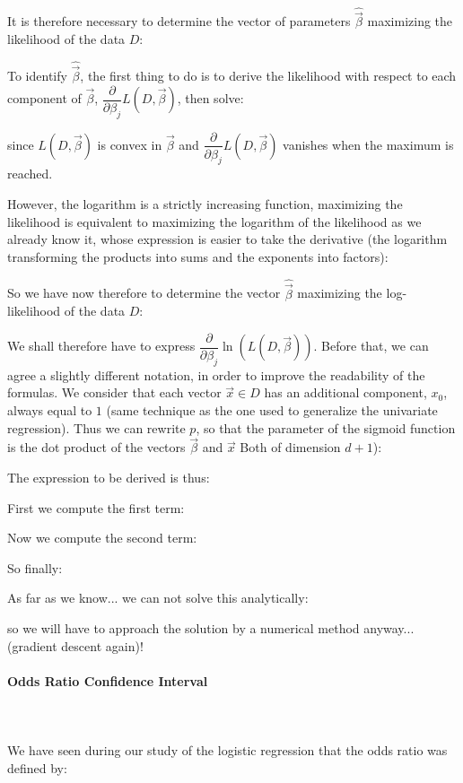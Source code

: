 	It is therefore necessary to determine the vector of parameters $\hat{\vec{\beta}}$ maximizing the likelihood of the data $D$:
	
	To identify $\hat{\vec{\beta}}$, the first thing to do is to derive the likelihood with respect to each component of $\vec{\beta}$, $\dfrac{\partial }{\partial \beta_j}L(D,\vec{\beta})$, then solve:
	
	since $L(D,\vec{\beta})$ is convex in $\vec{\beta}$ and $\dfrac{\partial }{\partial \beta_j}L(D,\vec{\beta})$ vanishes when the maximum is reached.
	
	However, the logarithm is a strictly increasing function, maximizing the likelihood is equivalent to maximizing the logarithm of the likelihood as we already know it, whose expression is easier to take the derivative (the logarithm transforming the products into sums and the exponents into factors):
	
	So we have now therefore to determine the vector $\hat{\vec{\beta}}$ maximizing the log-likelihood of the data $D$:
	
	We shall therefore have to express $\dfrac{\partial }{\partial \beta_j}\ln(L(D,\vec{\beta}))$. Before that, we can agree a slightly different notation, in order to improve the readability of the formulas. We consider that each vector $\vec{x}\in D$ has an additional component, $x_0$, always equal to $1$ (same technique as the one used to generalize the univariate regression). Thus we can rewrite $p$, so that the parameter of the sigmoid function is the dot product of the vectors $\vec{\beta}$ and $\vec{x}$ Both of dimension $d + 1$):
	
	The expression to be derived is thus:
	
	First we compute the first term:
	
	Now we compute the second term:
	
	So finally:
	
	As far as we know... we can not solve this analytically:
	
	so we will have to approach the solution by a numerical method anyway... (gradient descent again)!
	
	\paragraph{Odds Ratio Confidence Interval}\mbox{}\\\\
	We have seen during our study of the logistic regression that the odds ratio was defined by:
	

